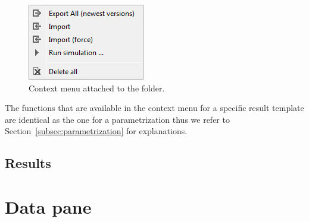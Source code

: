 \begin{figure}[htb]
	\centering
		\includegraphics[scale=0.6]{images/menuResultTemplateFolder.png}
	\caption{Context menu attached to the  folder.}
	\label{fig:menuResultTemplateFolder}
\end{figure}

The functions that are available in the context menu for a specific result template are identical as the one for a parametrization thus we refer to Section~\ref{subsec:parametrization} for explanations.

\subsection{Results}
\label{subsec:results}

\section{Data pane}
\label{sec:uiDataPane}

